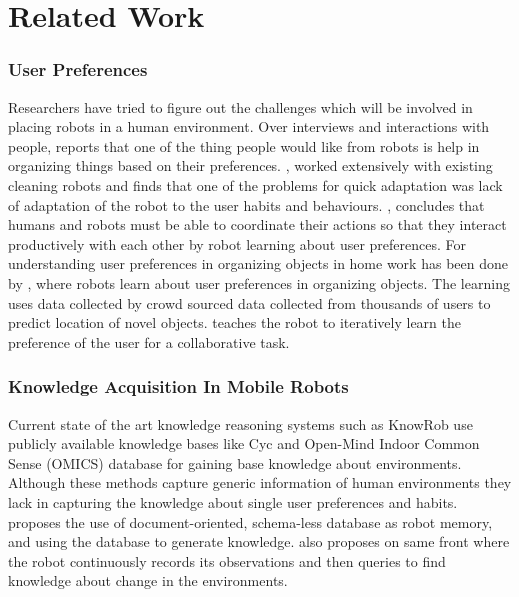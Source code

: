\chapter{Related Work}


\subsection{User Preferences}
\label{sub:user preference}
Researchers have tried to figure out the challenges which will be involved in placing robots in a human environment. Over interviews and interactions with people,  \cite{pantofaru_exploring_2012} reports that one of the thing people would like from robots is help in organizing things based on their preferences.
\cite{Fink2013}, worked extensively with existing cleaning robots and finds that one of the problems for quick adaptation was lack of adaptation of the robot to the user habits and behaviours. \cite{fong2003survey}, concludes that humans and robots must be able to coordinate their actions so that they interact productively with each other by robot learning about user preferences. For understanding user preferences in organizing objects in home work has  been done by  \cite{abdo2015robot}, where robots learn about user preferences in organizing objects. The learning uses data collected by  crowd sourced data collected from thousands of users to predict location of novel objects. \cite{nikolaidis2013human} teaches the robot to iteratively learn the preference of the user for a collaborative task.

\subsection{Knowledge Acquisition In Mobile Robots}
Current state of the art knowledge reasoning systems such as KnowRob \citep{tenorth2013knowrob} use publicly available knowledge bases like Cyc \citep{lenat1995cyc} and Open-Mind Indoor Common Sense (OMICS) database \citep{singh2002open} for gaining base knowledge about environments.  Although these methods capture generic information of human environments they lack in capturing the knowledge about single user preferences and habits. \cite{niemueller2012generic} proposes the use of document-oriented, schema-less database as robot memory, and using the database to generate knowledge. \cite{mason2012object} also proposes on same front where the robot continuously records its observations and then queries to find knowledge about change in the environments.

